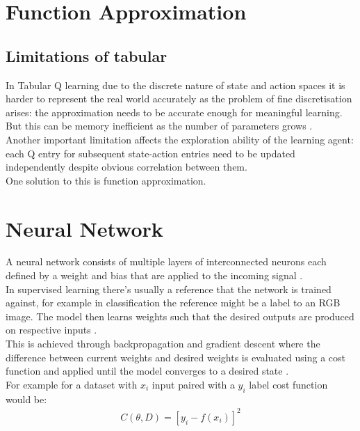 \section{Function Approximation}

\subsection{Limitations of tabular}

In Tabular Q learning due to the discrete nature of 
state and action spaces it is harder to represent the real world accurately as the problem of fine discretisation arises: the approximation needs to be accurate enough for meaningful learning. But this can be memory inefficient as the number of parameters grows \cite{lecture_intro_to_deep_rl}. \\

Another important limitation affects the exploration ability of the learning agent: each Q entry for subsequent state-action entries need to be updated independently despite obvious correlation between them.\\

One solution to this is function approximation. 

\section{Neural Network}

A neural network consists of multiple layers of interconnected neurons each defined by a weight and bias that are applied to the incoming signal \cite{lecture_intro_to_deep_rl}.\\

In supervised learning there's usually a reference that 
the network is trained against, for example in classification the reference might be a label to an RGB image. The model then learns weights such that the desired outputs are produced on respective inputs \cite{lecture_intro_to_deep_rl} . \\

This is achieved through backpropagation and gradient
descent where the difference between current weights and
desired weights is evaluated using a cost function and
applied until the model converges to a desired state
\cite{lecture_intro_to_deep_rl} .\\

For example for a dataset with $x_i$ input paired with a $y_i$ label cost function would be: 
\begin{align}
    C(\theta, D) = [y_i - f(x_i)]^2
\end{align}

